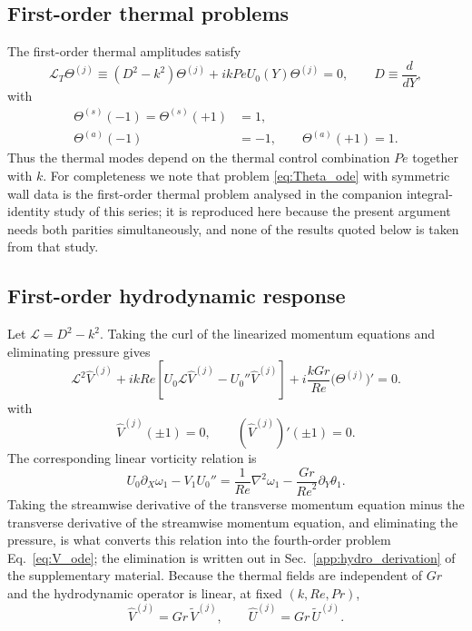 \documentclass[12pt,a4paper]{article}
\newcommand{\Rey}{\mathit{Re}}
\newcommand{\Pe}{\mathit{Pe}}
\newcommand{\Grr}{\mathit{Gr}}
\renewcommand{\Pr}{\mathit{Pr}}
\begin{document}
\subsection{First-order thermal problems}
\label{subsec:first_order_thermal}

The first-order thermal amplitudes satisfy
\begin{equation}
  \mathcal L_T\Theta^{(j)}\equiv
  (D^2-k^2)\Theta^{(j)}+ik\Pe U_0(Y)\Theta^{(j)}=0,
  \qquad D\equiv\frac{d}{dY},
  \label{eq:Theta_ode}
\end{equation}
with
\begin{align}
  \Theta^{(s)}(-1)=\Theta^{(s)}(+1)&=1,\\
  \Theta^{(a)}(-1)&=-1,\qquad \Theta^{(a)}(+1)=1.
\end{align}
Thus the thermal modes depend on the thermal control combination $\Pe$ together with $k$.
For completeness we note that problem \eqref{eq:Theta_ode} with symmetric wall data is the
first-order thermal problem analysed in the companion integral-identity study of this series; it
is reproduced here because the present argument needs both parities simultaneously, and none of the
results quoted below is taken from that study.

\subsection{First-order hydrodynamic response}
\label{subsec:first_order_hydro}

Let $\mathcal L=D^2-k^2$. Taking the curl of the linearized momentum equations and eliminating pressure gives
\begin{equation}
  \mathcal L^2\widehat V^{(j)}
  +ik\Rey
  \left[
    U_0\mathcal L\widehat V^{(j)}
    -U_0''\widehat V^{(j)}
  \right]
  +i\frac{k\Grr}{\Rey}
  \bigl(\Theta^{(j)}\bigr)'=0.
  \label{eq:V_ode}
\end{equation}
with
\begin{equation}
  \widehat V^{(j)}(\pm1)=0,\qquad
  (\widehat V^{(j)})'(\pm1)=0.
  \label{eq:V_BC}
\end{equation}
The corresponding linear vorticity relation is
\begin{equation}
  U_0\partial_X\omega_1-V_1U_0''
  =\frac{1}{\Rey}\nabla^2\omega_1
  -\frac{\Grr}{\Rey^2}\partial_Y\theta_1.
  \label{eq:vorticity_linear}
\end{equation}
Taking the streamwise derivative of the transverse momentum equation minus the
transverse derivative of the streamwise momentum equation, and eliminating the
pressure, is what converts this relation into the fourth-order problem
Eq.~\eqref{eq:V_ode}; the elimination is written out in
Sec.~\ref{app:hydro_derivation} of the supplementary material.
Because the thermal fields are independent of $\Grr$ and the hydrodynamic
operator is linear, at fixed $(k,\Rey,\Pr)$,
\begin{equation}
  \widehat V^{(j)}
  =
  \Grr\,\widetilde V^{(j)},
  \qquad
  \widehat U^{(j)}
  =
  \Grr\,\widetilde U^{(j)}.
  \label{eq:V_Gr_scaling}
\end{equation}
\end{document}
